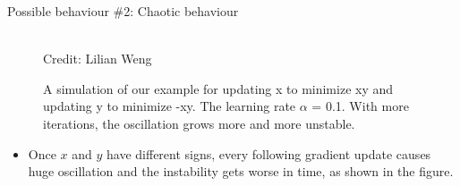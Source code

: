 \begin{frame} {Possible behaviour \#2: Chaotic behaviour}
  \begin{figure}
    \centering
      \tiny{\\Credit: Lilian Weng}
      \caption{\footnotesize A simulation of our example for updating x to minimize xy and updating y to minimize -xy. The learning rate $\alpha$ = 0.1. With more iterations, the oscillation grows more and more unstable.}
  \end{figure}
  \begin{itemize}
    \item Once $x$ and $y$ have different signs, every following gradient update causes huge oscillation and the instability gets worse in time, as shown in the figure.
  \end{itemize}
\end{frame}


